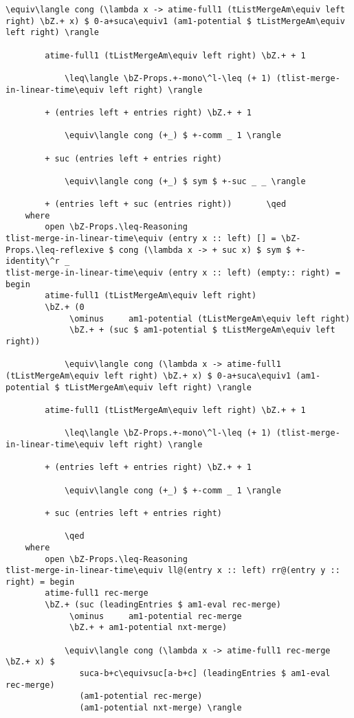 \begin{lstlisting}[caption={Merging heaps},label={lst:appendix:heap:merge}]
            \equiv\langle cong (\lambda x -> atime-full1 (tListMergeAm\equiv left right) \bZ.+ x) $ 0-a+suca\equiv1 (am1-potential $ tListMergeAm\equiv left right) \rangle

        atime-full1 (tListMergeAm\equiv left right) \bZ.+ + 1

            \leq\langle \bZ-Props.+-mono\^l-\leq (+ 1) (tlist-merge-in-linear-time\equiv left right) \rangle

        + (entries left + entries right) \bZ.+ + 1

            \equiv\langle cong (+_) $ +-comm _ 1 \rangle

        + suc (entries left + entries right)

            \equiv\langle cong (+_) $ sym $ +-suc _ _ \rangle

        + (entries left + suc (entries right))       \qed
    where
        open \bZ-Props.\leq-Reasoning
tlist-merge-in-linear-time\equiv (entry x :: left) [] = \bZ-Props.\leq-reflexive $ cong (\lambda x -> + suc x) $ sym $ +-identity\^r _
tlist-merge-in-linear-time\equiv (entry x :: left) (empty:: right) = begin
        atime-full1 (tListMergeAm\equiv left right)
        \bZ.+ (0
             \ominus     am1-potential (tListMergeAm\equiv left right)
             \bZ.+ + (suc $ am1-potential $ tListMergeAm\equiv left right))

            \equiv\langle cong (\lambda x -> atime-full1 (tListMergeAm\equiv left right) \bZ.+ x) $ 0-a+suca\equiv1 (am1-potential $ tListMergeAm\equiv left right) \rangle

        atime-full1 (tListMergeAm\equiv left right) \bZ.+ + 1

            \leq\langle \bZ-Props.+-mono\^l-\leq (+ 1) (tlist-merge-in-linear-time\equiv left right) \rangle

        + (entries left + entries right) \bZ.+ + 1

            \equiv\langle cong (+_) $ +-comm _ 1 \rangle

        + suc (entries left + entries right)

            \qed
    where
        open \bZ-Props.\leq-Reasoning
tlist-merge-in-linear-time\equiv ll@(entry x :: left) rr@(entry y :: right) = begin
        atime-full1 rec-merge
        \bZ.+ (suc (leadingEntries $ am1-eval rec-merge)
             \ominus     am1-potential rec-merge
             \bZ.+ + am1-potential nxt-merge)

            \equiv\langle cong (\lambda x -> atime-full1 rec-merge \bZ.+ x) $
               suca-b+c\equivsuc[a-b+c] (leadingEntries $ am1-eval rec-merge)
               (am1-potential rec-merge)
               (am1-potential nxt-merge) \rangle


\end{lstlisting}
